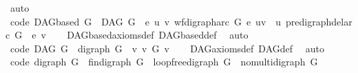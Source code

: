 \begin{isabellebody}
\ auto%
\endisatagproof
{\isafoldproof}%
%
\isadelimproof
\ \isanewline
%
\endisadelimproof
\isanewline
{}\isamarkupfalse%
\ {\isacharbrackleft}{\kern0pt}code{\isacharbrackright}{\kern0pt}{\isacharcolon}{\kern0pt}\ {\isachardoublequoteopen}DAGbased\ G\ {\isacharequal}{\kern0pt}\ {\isacharparenleft}{\kern0pt}DAG\ G\ {\isasymand}\ {\isacharparenleft}{\kern0pt}{\isasymforall}e\ u\ v{\isachardot}{\kern0pt}\ wf{\isacharunderscore}{\kern0pt}digraph{\isachardot}{\kern0pt}arc\ G\ e\ {\isacharparenleft}{\kern0pt}u{\isacharcomma}{\kern0pt}v{\isacharparenright}{\kern0pt}\ {\isasymlongrightarrow}\ {\isasymnot}{\isacharparenleft}{\kern0pt}u\ {\isasymrightarrow}\isactrlsup {\isacharasterisk}{\kern0pt}\isactrlbsub {\isacharparenleft}{\kern0pt}pre{\isacharunderscore}{\kern0pt}digraph{\isachardot}{\kern0pt}del{\isacharunderscore}{\kern0pt}arc\ G\ \ e{\isacharparenright}{\kern0pt}\isactrlesub \ v{\isacharparenright}{\kern0pt}{\isacharparenright}{\kern0pt}{\isacharparenright}{\kern0pt}{\isachardoublequoteclose}\isanewline
%
\isadelimproof
\ \ %
\endisadelimproof
%
\isatagproof
{}\isamarkupfalse%
\ DAGbased{\isacharunderscore}{\kern0pt}axioms{\isacharunderscore}{\kern0pt}def\ DAGbased{\isacharunderscore}{\kern0pt}def\ \isamarkupfalse%
\ auto%
\endisatagproof
{\isafoldproof}%
%
\isadelimproof
\isanewline
%
\endisadelimproof
\isanewline
{}\isamarkupfalse%
\ {\isacharbrackleft}{\kern0pt}code{\isacharbrackright}{\kern0pt}{\isacharcolon}{\kern0pt}\ {\isachardoublequoteopen}DAG\ G\ {\isacharequal}{\kern0pt}\ {\isacharparenleft}{\kern0pt}digraph\ G\ {\isasymand}\ {\isacharparenleft}{\kern0pt}{\isasymforall}v{\isachardot}{\kern0pt}\ {\isasymnot}{\isacharparenleft}{\kern0pt}v\ {\isasymrightarrow}\isactrlsup {\isacharplus}{\kern0pt}\isactrlbsub G\isactrlesub \ v{\isacharparenright}{\kern0pt}{\isacharparenright}{\kern0pt}{\isacharparenright}{\kern0pt}{\isachardoublequoteclose}\isanewline
%
\isadelimproof
\ \ %
\endisadelimproof
%
\isatagproof
{}\isamarkupfalse%
\ DAG{\isacharunderscore}{\kern0pt}axioms{\isacharunderscore}{\kern0pt}def\ DAG{\isacharunderscore}{\kern0pt}def\ \isamarkupfalse%
\ auto%
\endisatagproof
{\isafoldproof}%
%
\isadelimproof
\isanewline
%
\endisadelimproof
\isanewline
{}\isamarkupfalse%
\ {\isacharbrackleft}{\kern0pt}code{\isacharbrackright}{\kern0pt}{\isacharcolon}{\kern0pt}\ {\isachardoublequoteopen}digraph\ G\ {\isacharequal}{\kern0pt}\ {\isacharparenleft}{\kern0pt}fin{\isacharunderscore}{\kern0pt}digraph\ G\ {\isasymand}\ loopfree{\isacharunderscore}{\kern0pt}digraph\ G\ {\isasymand}\ nomulti{\isacharunderscore}{\kern0pt}digraph\ G{\isacharparenright}{\kern0pt}{\isachardoublequoteclose}\isanewline

\end{isabellebody}
